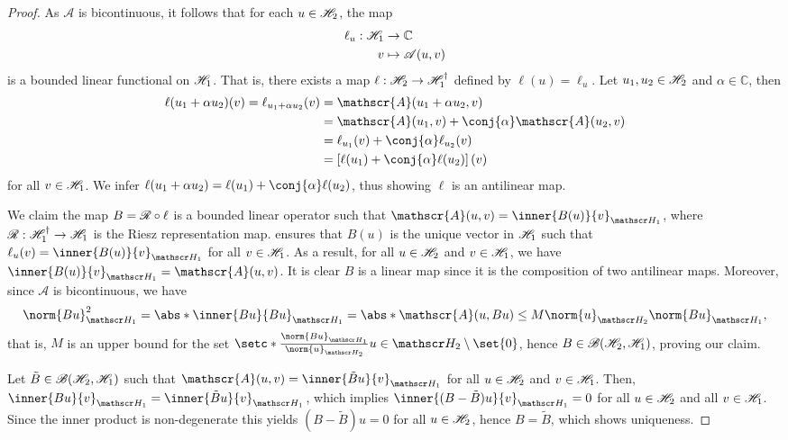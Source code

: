 \begin{proof}
    As \(\mathscr{A}\) is bicontinuous, it follows that for each \(u \in \mathscr{H}_2\), the map
    \begin{align*}
        \ell_u : \mathscr{H}_1 &\to \mathbb{C}\\
                          v &\mapsto \mathscr{A}(u,v)
    \end{align*}
    is a bounded linear functional on \(\mathscr{H}_1\). That is, there exists a map \(\ell : \mathscr{H}_2 \to \mathscr{H}_1^\dag\) defined by \(\ell(u) = \ell_u\). Let \(u_1, u_2 \in \mathscr{H}_2\) and \(\alpha \in \mathbb{C}\), then
    \begin{align*}
        \ell(u_1 + \alpha u_2)(v) = \ell_{u_1 + \alpha u_2}(v) &= \mathscr{A}(u_1 + \alpha u_2, v)\\
                                                               &= \mathscr{A}(u_1, v) + \conj{\alpha} \mathscr{A}(u_2, v)\\
                                                               &= \ell_{u_1}(v) + \conj{\alpha} \ell_{u_2}(v)\\
                                                               &= \left[\ell(u_1) + \conj{\alpha} \ell(u_2)\right](v)
    \end{align*}
    for all \(v \in \mathscr{H}_1\). We infer \(\ell(u_1 + \alpha u_2) = \ell(u_1) + \conj{\alpha}\ell(u_2)\), thus showing \(\ell\) is an antilinear map.

    We claim the map \(B = \mathscr{R} \circ \ell\) is a bounded linear operator such that \(\mathscr{A}(u,v) = \inner{B(u)}{v}_{\hilbert_1}\), where \(\mathscr{R} : \mathscr{H}_1^\dag \to \mathscr{H}_1\) is the Riesz representation map.  ensures that \(B(u)\) is the unique vector in \(\mathscr{H}_1\) such that \(\ell_u(v) = \inner{B(u)}{v}_{\hilbert_1}\) for all \(v \in \mathscr{H}_1\). As a result, for all \(u \in \mathscr{H}_2\) and \(v \in \mathscr{H}_1\), we have \(\inner{B(u)}{v}_{\hilbert_1} = \mathscr{A}(u,v)\). It is clear \(B\) is a linear map since it is the composition of two antilinear maps. Moreover, since \(\mathscr{A}\) is bicontinuous, we have
    \begin{equation*}
        \norm{Bu}_{\hilbert_1}^2 = \abs*{\inner{Bu}{Bu}_{\hilbert_1}} = \abs*{\mathscr{A}(u, Bu)} \leq M \norm{u}_{\hilbert_2} \norm{Bu}_{\hilbert_1},
    \end{equation*}
    that is, \(M\) is an upper bound for the set \(\setc*{\frac{\norm{Bu}_{\hilbert_1}}{\norm{u}_{\hilbert_2}}}{u \in \hilbert_2 \setminus \set{0}}\), hence \(B \in \mathscr{B}(\mathscr{H}_2, \mathscr{H}_1)\), proving our claim.

    Let \(\tilde{B} \in \mathscr{B}(\mathscr{H}_2, \mathscr{H}_1)\) such that \(\mathscr{A}(u,v) = \inner{\tilde{B}u}{v}_{\hilbert_1}\) for all \(u \in \mathscr{H}_2\) and \(v \in \mathscr{H}_1\). Then, \(\inner{Bu}{v}_{\hilbert_1} = \inner{\tilde{B}u}{v}_{\hilbert_1}\), which implies \(\inner{(B - \tilde{B})u}{v}_{\hilbert_1} = 0\) for all \(u \in \mathscr{H}_2\) and all \(v \in \mathscr{H}_1\). Since the inner product is non-degenerate this yields \((B - \tilde{B})u = 0\) for all \(u \in \mathscr{H}_2\), hence \(B = \tilde{B}\), which shows uniqueness.
\end{proof}

